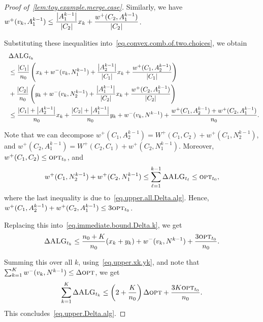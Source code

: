 \begin{proof}[Proof of~\cref{lem:toy.example.merge.case}]
    Similarly, we have $ w^{+}(v_{k}, A_{1}^{k-1}) \leq \dfrac{\left| A_{1}^{k-1} \right|}{\left| C_{2} \right|}x_{k} + \dfrac{w^{+}(C_{2}, A_{1}^{k-1})}{\left| C_{2} \right|} $.

    Substituting these inequalities into~\eqref{eq.convex.comb.of.two.choices}, we obtain
    \begin{align}
        \>\>\>&\Delta \textsc{ALG}_{t_{k}} \nonumber \\
              &\leq \dfrac{\left| C_{1} \right|}{n_0}\left(x_{k} + w^{-}(v_{k}, N^{k-1}_{1}) + \dfrac{\left| A_{2}^{k-1} \right|}{\left| C_{1} \right|}x_{k} + \dfrac{w^{+}(C_{1}, A_{2}^{k-1})}{\left| C_{1} \right|} \right) \nonumber \\
              &+ \dfrac{\left| C_{2} \right|}{n_0}\left(y_{k} + w^{-}(v_{k}, N^{k-1}_{2}) + \dfrac{\left| A_{1}^{k-1} \right|}{\left| C_{2} \right|}x_{k} + \dfrac{w^{+}(C_{2}, A_{1}^{k-1})}{\left| C_{2} \right|}\right) \nonumber \\
              &\leq \dfrac{\left| C_{1} \right|+\left| A_{2}^{k-1} \right|}{n_0}x_{k} + \dfrac{\left| C_{2} \right|+\left| A_{1}^{k-1} \right|}{n_0}y_{k} + w^{-}(v_{k}, N^{k-1}) +  \dfrac{w^{+}(C_{1}, A_{2}^{k-1}) + w^{+}(C_2, A_{1}^{k-1})}{n_0}.\label{eq.immediate.bound.Delta.k}
    \end{align}

    Note that we can decompose $ w^{+}(C_1, A_{2}^{k-1}) = W^{+}(C_{1}, C_{2}) + w^{+}(C_{1}, N_{2}^{k-1}) $, and $ w^{+}(C_2, A_{1}^{k-1}) = W^{+}(C_{2}, C_{1}) + w^{+}(C_{2}, N_{1}^{k-1}) $.
    Moreover, $ w^{+}(C_1, C_2) \le \textsc{opt}_{t_0} $, and
    \begin{align}
    w^{+}(C_{1}, N_{2}^{k-1}) + w^{+}(C_{2}, N_{1}^{k-1}) \leq \sum_{\ell=1}^{k-1}\Delta \textsc{ALG}_{t_{\ell}} \leq \textsc{opt}_{t_0},\nonumber
    \end{align}
    where the last inequality is due to~\eqref{eq.upper.all.Delta.alg}.
    Hence, $ w^{+}(C_{1}, A_{2}^{k-1}) + w^{+}(C_2, A_{1}^{k-1}) \leq 3\textsc{opt}_{t_0} $.

    Replacing this into~\eqref{eq.immediate.bound.Delta.k}, we get
    \begin{align}
        \Delta \textsc{ALG}_{t_{k}} \leq \dfrac{n_{0}+K}{n_{0}}(x_{k}+y_{k}) + w^{-}( v_{k}, N^{k-1} ) + \dfrac{3\textsc{opt}_{t_0}}{n_0}. \nonumber
    \end{align}

    Summing this over all $ k $, using~\eqref{eq.upper.xk.yk}, and note that $ \sum_{k=1}^{K}w^{-}(v_{k}, N^{k-1}) \leq \Delta \textsc{opt} $, we get
    \begin{align}
        \sum_{k=1}^{K}\Delta \textsc{ALG}_{t_{k}} \leq \left(2+\dfrac{K}{n_0}\right)\Delta\textsc{opt} + \dfrac{3K\textsc{opt}_{t_0}}{n_0}. \nonumber
    \end{align}
    This concludes~\eqref{eq.upper.Delta.alg}.


\end{proof}
